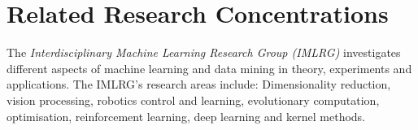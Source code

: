\documentclass{llncs}
\begin{document}
\section{Related Research Concentrations}
The \emph{Interdisciplinary Machine Learning Research Group (IMLRG)} investigates different aspects of machine learning and data mining in theory, experiments and applications. The IMLRG's research areas include: Dimensionality reduction, vision processing, robotics control and learning,  evolutionary computation, optimisation, reinforcement learning, deep learning and kernel methods. %



\end{document}
